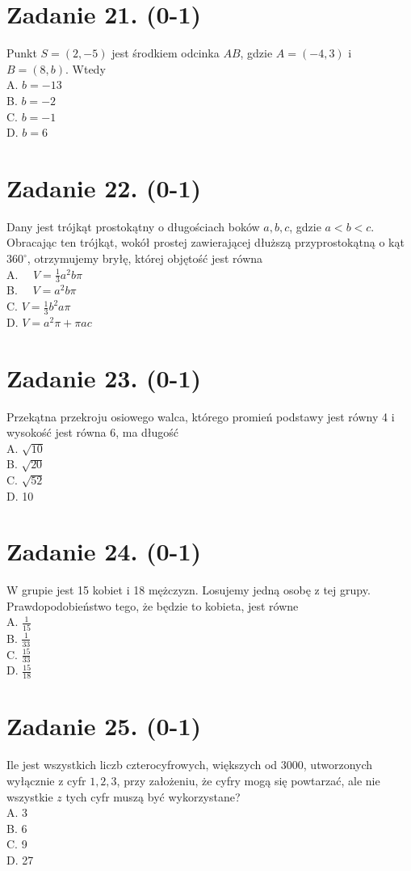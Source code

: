 \documentclass[10pt]{article}
\begin{document}
\section*{Zadanie 21. (0-1)}
Punkt \(S=(2,-5)\) jest środkiem odcinka \(A B\), gdzie \(A=(-4,3)\) i \(B=(8, b)\). Wtedy\\
A. \(b=-13\)\\
B. \(b=-2\)\\
C. \(b=-1\)\\
D. \(b=6\)

\section*{Zadanie 22. (0-1)}
Dany jest trójkąt prostokątny o długościach boków \(a, b, c\), gdzie \(a<b<c\). Obracając ten trójkąt, wokół prostej zawierającej dłuższą przyprostokątną o kąt \(360^{\circ}\), otrzymujemy bryłę, której objętość jest równa\\
A. \(\quad V=\frac{1}{3} a^{2} b \pi\)\\
B. \(\quad V=a^{2} b \pi\)\\
C. \(V=\frac{1}{3} b^{2} a \pi\)\\
D. \(V=a^{2} \pi+\pi a c\)

\section*{Zadanie 23. (0-1)}
Przekątna przekroju osiowego walca, którego promień podstawy jest równy 4 i wysokość jest równa 6, ma długość\\
A. \(\sqrt{10}\)\\
B. \(\sqrt{20}\)\\
C. \(\sqrt{52}\)\\
D. 10

\section*{Zadanie 24. (0-1)}
W grupie jest 15 kobiet i 18 mężczyzn. Losujemy jedną osobę z tej grupy. Prawdopodobieństwo tego, że będzie to kobieta, jest równe\\
A. \(\frac{1}{15}\)\\
B. \(\frac{1}{33}\)\\
C. \(\frac{15}{33}\)\\
D. \(\frac{15}{18}\)

\section*{Zadanie 25. (0-1)}
Ile jest wszystkich liczb czterocyfrowych, większych od 3000, utworzonych wyłącznie z cyfr \(1,2,3\), przy założeniu, że cyfry mogą się powtarzać, ale nie wszystkie \(z\) tych cyfr muszą być wykorzystane?\\
A. 3\\
B. 6\\
C. 9\\
D. 27
\end{document}

